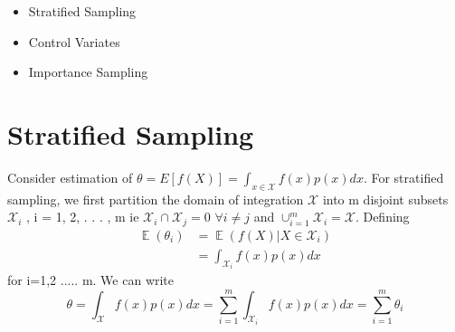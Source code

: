 \documentclass[a4paper,twoside]{iiththesis}
\theoremstyle{definition}
\theoremstyle{definition}
\theoremstyle{remark}
\DeclareMathOperator*{\E}{\mathop{\mathbb{E}}}
\begin{document}
\begin{itemize}
\item Stratified Sampling 
\item Control Variates 
\item Importance Sampling
\end{itemize}

\newpage
\section{Stratified Sampling}

Consider estimation of  $\theta = E[f(X)] =\int_{x\in\mathcal{X}} f(x) p(x) dx $. For stratified sampling, we first partition the domain of integration $\mathcal{X}$ into m disjoint subsets
$\mathcal{X}_i$ , i = 1, 2, . . . , m ie $ \mathcal{X}_i \cap \mathcal{X}_j = 0$ $ \forall i \neq j$ and $\cup_{i=1}^m \mathcal{X}_i= \mathcal{X}$. Defining 
\begin{align}
\E (\theta_i) &= \E (f(X) | X\in \mathcal{X}_i)\\
					&= \int_{\mathcal{X}_i} f(x) p(x) dx
\end{align}
for i=1,2 ..... m. We can write 
\begin{equation}
		\theta = \int_{\mathcal{X}} f(x) p(x) dx = \sum_{i=1}^m \int_{\mathcal{X}_i} f(x) p(x) dx = \sum_{i=1}^m \theta_i
\end{equation}
\end{document}
